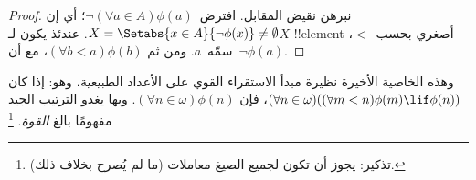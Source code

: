 \documentclass[../../../include/open-logic-section]{subfiles}
\begin{document}
\begin{proof}
نبرهن نقيض المقابل. افترض~$\lnot(\forall a \in A)\phi(a)$؛ أي إن
$X = \Setabs{x \in A}{\lnot\phi(x)} \neq \emptyset$. عندئذ يكون
لـ$X$ !!{element} أصغري بحسب~$<$، سمّه~$a$. ومن ثم
$(\forall b < a)\phi(b)$، مع أن~$\lnot \phi(a)$.
\end{proof}\noindent
وهذه الخاصية الأخيرة نظيرة مبدأ الاستقراء القوي على الأعداد الطبيعية،
وهو: إذا كان
$(\forall n \in \omega)((\forall m < n)\phi(m) \lif \phi(n))$، فإن
$(\forall n \in \omega)\phi(n)$. وبها يغدو الترتيب الجيد مفهومًا بالغ
\emph{القوة}.
\footnote{تذكير: يجوز أن تكون لجميع الصيغ معاملات (ما لم يُصرح بخلاف ذلك).}
\end{document}
